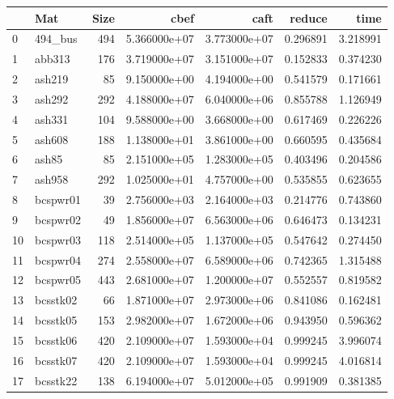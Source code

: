 \begin{tabular}{llrrrrr}
\toprule
{} &                      Mat &  Size &          cbef &          caft &    reduce &       time \\
\midrule
0   &                  494\_bus &   494 &  5.366000e+07 &  3.773000e+07 &  0.296891 &   3.218991 \\
1   &                   abb313 &   176 &  3.719000e+07 &  3.151000e+07 &  0.152833 &   0.374230 \\
2   &                   ash219 &    85 &  9.150000e+00 &  4.194000e+00 &  0.541579 &   0.171661 \\
3   &                   ash292 &   292 &  4.188000e+07 &  6.040000e+06 &  0.855788 &   1.126949 \\
4   &                   ash331 &   104 &  9.588000e+00 &  3.668000e+00 &  0.617469 &   0.226226 \\
5   &                   ash608 &   188 &  1.138000e+01 &  3.861000e+00 &  0.660595 &   0.435684 \\
6   &                    ash85 &    85 &  2.151000e+05 &  1.283000e+05 &  0.403496 &   0.204586 \\
7   &                   ash958 &   292 &  1.025000e+01 &  4.757000e+00 &  0.535855 &   0.623655 \\
8   &                 bcspwr01 &    39 &  2.756000e+03 &  2.164000e+03 &  0.214776 &   0.743860 \\
9   &                 bcspwr02 &    49 &  1.856000e+07 &  6.563000e+06 &  0.646473 &   0.134231 \\
10  &                 bcspwr03 &   118 &  2.514000e+05 &  1.137000e+05 &  0.547642 &   0.274450 \\
11  &                 bcspwr04 &   274 &  2.558000e+07 &  6.589000e+06 &  0.742365 &   1.315488 \\
12  &                 bcspwr05 &   443 &  2.681000e+07 &  1.200000e+07 &  0.552557 &   0.819582 \\
13  &                 bcsstk02 &    66 &  1.871000e+07 &  2.973000e+06 &  0.841086 &   0.162481 \\
14  &                 bcsstk05 &   153 &  2.982000e+07 &  1.672000e+06 &  0.943950 &   0.596362 \\
15  &                 bcsstk06 &   420 &  2.109000e+07 &  1.593000e+04 &  0.999245 &   3.996074 \\
16  &                 bcsstk07 &   420 &  2.109000e+07 &  1.593000e+04 &  0.999245 &   4.016814 \\
17  &                 bcsstk22 &   138 &  6.194000e+07 &  5.012000e+05 &  0.991909 &   0.381385 \\

\end{tabular}
